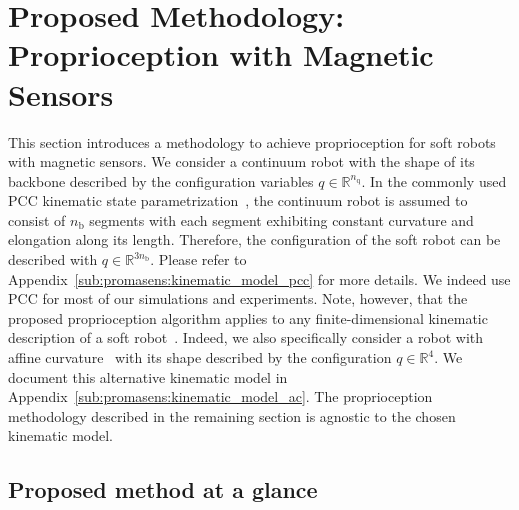 
\section{Proposed Methodology: Proprioception with Magnetic Sensors}

This section introduces a methodology to achieve proprioception for soft robots with magnetic sensors.
%
We consider a continuum robot with the shape of its backbone described by the configuration variables $q \in \mathbb{R}^{n_\mathrm{q}}$.
In the commonly used \gls{PCC} kinematic state parametrization~\cite{webster2010design}, the continuum robot is assumed to consist of $n_\mathrm{b}$ segments with each segment exhibiting constant curvature and elongation along its length. Therefore, the configuration of the soft robot can be described with $q \in \mathbb{R}^{3n_\mathrm{b}}$.
Please refer to Appendix~\ref{sub:promasens:kinematic_model_pcc} for more details.
We indeed use PCC for most of our simulations and experiments.
Note, however, that the proposed proprioception algorithm applies to any finite-dimensional kinematic description of a soft robot~\cite{armanini2023soft}.
Indeed, we also specifically consider a robot with affine curvature~\cite{della2020soft, stella2023piecewise} with its shape described by the configuration $q \in \mathbb{R}^4$. We document this alternative kinematic model in Appendix~\ref{sub:promasens:kinematic_model_ac}.
The proprioception methodology described in the remaining section is agnostic to the chosen kinematic model.

\subsection{Proposed method at a glance}

